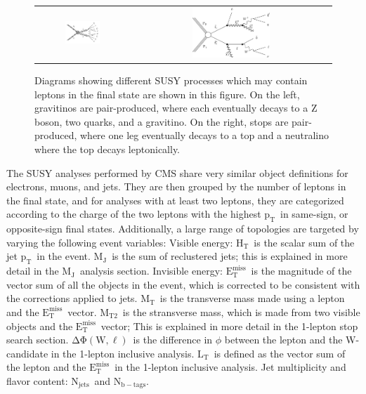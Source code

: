 \documentclass{article}
\newcommand{\MET}{${\mathrm{E_{T}^{miss}}}$}
\newcommand{\pt}{${\mathrm{p_{T}}}$}
\newcommand{\HT}{$\mathrm{H_T}$}
\newcommand{\MJ}{$\mathrm{M_J}$}
\newcommand{\MT}{$\mathrm{M_T}$}
\newcommand{\MTtwo}{$\mathrm{M_{T2}}$}
\newcommand{\LT}{$\mathrm{L_T}$}
\newcommand{\dphiwl}{$\mathrm{\Delta\Phi(W, \ell)}$}
\newcommand{\njets}{$\mathrm{N_{jets}}$}
\newcommand{\nbtags}{$\mathrm{N_{b-tags}}$}
\begin{document}
\begin{figure}[!htb]
\begin{center}
\begin{tabular}{cc}
\includegraphics[width=0.4\textwidth]{intro/Feynman_graph_T5ZZgmsb.pdf} &
\includegraphics[width=0.4\textwidth]{intro/T2tt.pdf}
\end{tabular}
\caption{
\label{fig:SMS}
Diagrams showing different SUSY processes which may contain leptons in the final state are shown in this figure.
On the left, gravitinos are pair-produced, where each eventually decays to a Z boson, two quarks, and a gravitino.
On the right, stops are pair-produced, where one leg eventually decays to a top and a neutralino where the top decays leptonically.
}
\end{center}
\end{figure}

The SUSY analyses performed by CMS share very similar object definitions for electrons, muons, and jets. 
They are then grouped by the number of leptons in the final state,
and for analyses with at least two leptons,
they are categorized according to the charge of the two leptons with the highest \pt\
in same-sign, or opposite-sign final states.
Additionally, a large range of topologies are targeted by varying the following event variables:
Visible energy:
\HT\ is the scalar sum of the jet \pt\ in the event.
\MJ\ is the sum of reclustered jets; this is explained in more detail in the \MJ\ analysis section.
Invisible energy:
\MET\ is the magnitude of the vector sum of all the objects in the event, which is corrected to be consistent with the corrections applied to jets.
\MT\ is the transverse mass made using a lepton and the \MET\ vector.
\MTtwo\ is the stransverse mass, which is made from two visible objects and the \MET\ vector; This is explained in more detail in the 1-lepton stop search section.
\dphiwl\ is the difference in $\phi$ between the lepton and the W-candidate in the 1-lepton inclusive analysis.
\LT\ is defined as the vector sum of the lepton and the \MET\ in the 1-lepton inclusive analysis.
Jet multiplicity and flavor content: \njets\ and \nbtags.
\end{document}
